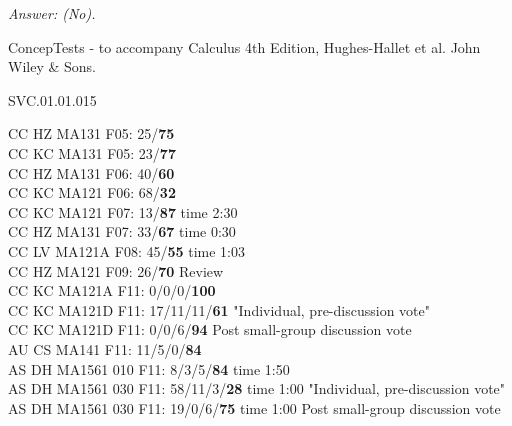 {\it Answer: (No).} 


\medskip
ConcepTests - to accompany Calculus 4th Edition, Hughes-Hallet et al. John Wiley \& Sons.

SVC.01.01.015




CC HZ MA131 F05: 25/{\bf75} \\
CC KC MA131 F05: 23/{\bf77} \\
CC HZ MA131 F06: 40/{\bf 60} \\
CC KC MA121 F06: 68/{\bf32} \\
CC KC MA121 F07: 13/{\bf 87} time 2:30 \\ 
CC HZ MA131 F07: 33/{\bf 67} time 0:30 \\ 
CC LV MA121A F08: 45/{\bf55} time 1:03 \\
CC HZ MA121 F09: 26/{\bf70} Review \\
CC KC MA121A F11: 0/0/0/{\bf100}  \\
CC KC MA121D F11: 17/11/11/{\bf61} "Individual, pre-discussion vote" \\
CC KC MA121D F11: 0/0/6/{\bf94} Post small-group discussion vote \\
AU CS MA141 F11: 11/5/0/{\bf84}  \\
AS DH MA1561 010 F11: 8/3/5/{\bf84} time 1:50  \\
AS DH MA1561 030 F11: 58/11/3/{\bf28} time 1:00 "Individual, pre-discussion vote" \\
AS DH MA1561 030 F11: 19/0/6/{\bf75} time 1:00 Post small-group discussion vote \\
